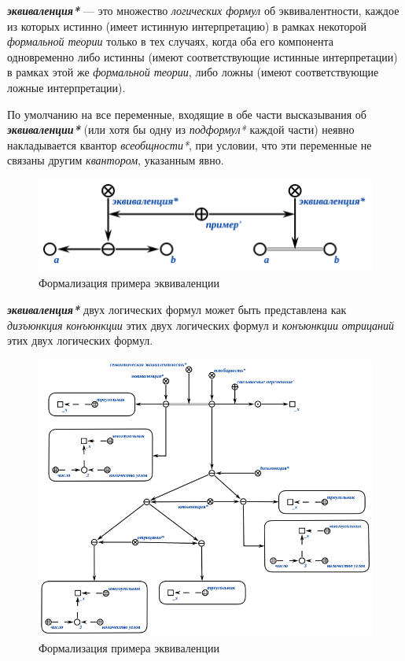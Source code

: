 \textbf{\textit{эквиваленция*}} --- это множество \textit{логических формул} об эквивалентности, каждое из которых истинно (имеет истинную интерпретацию) в рамках некоторой \textit{формальной теории} только в тех случаях, когда оба его компонента одновременно либо истинны (имеют соответствующие истинные интерпретации) в рамках этой же \textit{формальной теории}, либо ложны (имеют соответствующие ложные интерпретации).

По умолчанию на все переменные, входящие в обе части высказывания об \textbf{\textit{эквиваленции*}} (или хотя бы одну из \textit{подформул*} каждой части) неявно накладывается квантор \textit{всеобщности*}, при условии, что эти переменные не связаны другим \textit{квантором}, указанным явно.

\begin{figure}[H]
	\includegraphics[scale=0.8]{author/part2/figures/logic/equivalent.png}
	\caption{Формализация примера эквиваленции}
	\label{fig:equivalent}
\end{figure}

\textbf{\textit{эквиваленция*}} двух логических формул может быть представлена как \textit{дизъюнкция} \textit{конъюнкции} этих двух логических формул и \textit{конъюнкции} \textit{отрицаний} этих двух логических формул.

\begin{figure}[H]
	\includegraphics[scale=0.8]{author/part2/figures/logic/equivalence_representation.png}
	\caption{Формализация примера эквиваленции}
	\label{fig:equivalence_representation}
\end{figure}

